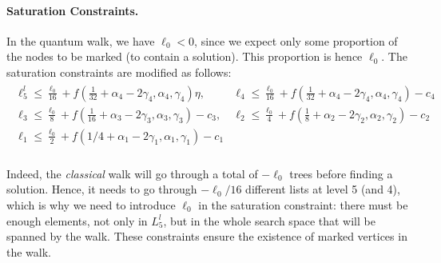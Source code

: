 
\paragraph{Saturation Constraints.}
In the quantum walk, we have $\ell_0 < 0$, since we expect only some proportion of the nodes to be marked (to contain a solution). This proportion is hence $\ell_0$. The saturation constraints are modified as follows:
\begin{align*}
\begin{array}{ll}
\ell_5^l \leq \frac{\ell_0}{16} + f(\frac{1}{32} + \alpha_4 - 2\gamma_4, \alpha_4, \gamma_4) \eta, & \ell_4 \leq \frac{\ell_0}{16} + f(\frac{1}{32} + \alpha_4 - 2\gamma_4, \alpha_4, \gamma_4) - c_4\\
\ell_3 \leq \frac{\ell_0}{8} + f(\frac{1}{16} + \alpha_3 - 2\gamma_3, \alpha_3, \gamma_3) - c_3,  & \ell_2 \leq \frac{\ell_0}{4} + f(\frac{1}{8} + \alpha_2 - 2\gamma_2, \alpha_2, \gamma_2) - c_2 \\
\ell_1 \leq \frac{\ell_0}{2} + f(1/4 + \alpha_1 - 2\gamma_1, \alpha_1, \gamma_1) - c_1 & \\
\end{array}
\end{align*}


Indeed, the \emph{classical} walk will go through a total of $-\ell_0$ trees before finding a solution. Hence, it needs to go through $-\ell_0/16$ different lists at level 5 (and 4), which is why we need to introduce $\ell_0$ in the saturation constraint: there must be enough elements, not only in $L_5^l$, but in the whole search space that will be spanned by the walk. These constraints ensure the existence of marked vertices in the walk.


